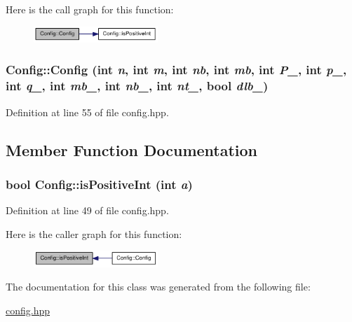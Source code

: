 Here is the call graph for this function:\nopagebreak
\begin{figure}[H]
\begin{center}
\leavevmode
\includegraphics[width=133pt]{class_config_aec74fc6881404a82143ef28fcebf3cb2_cgraph}
\end{center}
\end{figure}
\hypertarget{class_config_aae27971e1a25c43a395738b7742afebb}{
\subsubsection[{Config}]{\setlength{\rightskip}{0pt plus 5cm}Config::Config (int {\em n}, \/  int {\em m}, \/  int {\em nb}, \/  int {\em mb}, \/  int {\em P\_\-}, \/  int {\em p\_\-}, \/  int {\em q\_\-}, \/  int {\em mb\_\-}, \/  int {\em nb\_\-}, \/  int {\em nt\_\-}, \/  bool {\em dlb\_\-})}}
\label{class_config_aae27971e1a25c43a395738b7742afebb}


Definition at line 55 of file config.hpp.

\subsection{Member Function Documentation}
\hypertarget{class_config_a06b19f6b051be4b77ea61ee3ebd365d2}{
\subsubsection[{isPositiveInt}]{\setlength{\rightskip}{0pt plus 5cm}bool Config::isPositiveInt (int {\em a})}}
\label{class_config_a06b19f6b051be4b77ea61ee3ebd365d2}


Definition at line 49 of file config.hpp.

Here is the caller graph for this function:\nopagebreak
\begin{figure}[H]
\begin{center}
\leavevmode
\includegraphics[width=133pt]{class_config_a06b19f6b051be4b77ea61ee3ebd365d2_icgraph}
\end{center}
\end{figure}


The documentation for this class was generated from the following file:\begin{DoxyCompactItemize}
\item 
\hyperlink{config_8hpp}{config.hpp}\end{DoxyCompactItemize}
